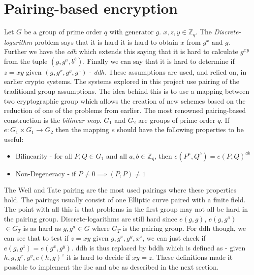 \section{Pairing-based encryption}
Let $G$ be a group of prime order $q$ with generator $g$. $x,z,y \in \mathbb{Z}_q$. The \emph{Discrete-logarithm} problem says that it is hard it is hard to obtain $x$ from $g^x$ and $g$. Further we have the \emph{\gls{cdh}} which extends this saying that it is hard to calculate $g^{xy}$ from the tuple $(g, g^a, b^b)$. Finally we can say that it is hard to determine if $z=xy$ given $(g, g^x, g^y, g^z)$ - \emph{\gls{ddh}}. These assumptions are used, and relied on, in earlier crypto systems. The systems explored in this project use pairing of the traditional group assumptions. The idea behind this is to use a mapping between two cryptographic group which allows the creation of new schemes based on the reduction of one of the problems from earlier. The most renowned pairing-based construction is the \emph{bilinear map}. $G_1$ and $G_2$ are groups of prime order $q$. If $e: G_1 \times G_1 \rightarrow G_2$ then the mapping $e$ should have the following properties to be useful: 
\begin{itemize}
\item Bilinearity - for all $P, Q \in G_1$ and all $a,b \in \mathbb{Z}_q$, then $e(P^a, Q^b) = e(P, Q)^{ab}$
\item Non-Degeneracy - if $P \neq 0 \implies (P,P) \neq 1$
\end{itemize}
The Weil and Tate pairing are the most used pairings where these properties hold. The pairings usually consist of one Elliptic curve paired with a finite field. 
The point with all this is that problems in the first group may not all be hard in the pairing group. Discrete-logarithms are still hard since $e(g,g)$, $e(g,g^a)$ $\in G_T$ is as hard as $g,g^a \in G$ where $G_T$ is the pairing group.
For \gls{ddh} though, we can see that to test if $z=xy$ given $g, g^x, g^y, x^z$, we can just check if $e(g, g^z) = e(g^x, g^y)$. \Gls{ddh} is thus replaced by \gls{bddh} which is defined as - given $h, g, g^x, g^y, e(h,g)^z$ it is hard to decide if $xy = z$. \cite{pairing-survey} These definitions made it possible to implement the \gls{ibe} and \gls{abe} as described in the next section.

